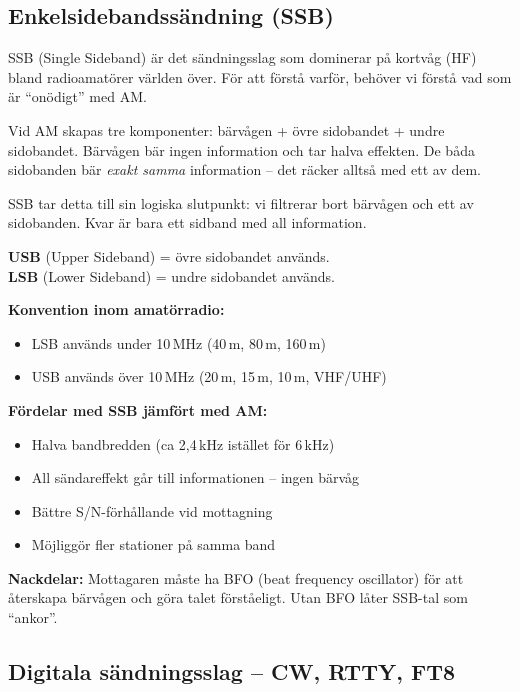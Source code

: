 \documentclass[a4paper,11pt,twoside]{book}
\newcommand{\emoji}[1]{{\emojifont #1}}
\begin{document}
\subsection{Enkelsidebandssändning (SSB)}

SSB (Single Sideband) är det sändningsslag som dominerar på
kortvåg (HF) bland radioamatörer världen över. För att förstå
varför, behöver vi förstå vad som är ``onödigt'' med AM.

Vid AM skapas tre komponenter: bärvågen + övre sidobandet + undre
sidobandet. Bärvågen bär ingen information och tar halva effekten.
De båda sidobanden bär \emph{exakt samma} information -- det räcker
alltså med ett av dem.

SSB tar detta till sin logiska slutpunkt: vi filtrerar bort bärvågen
och ett av sidobanden. Kvar är bara ett sidband med all information.

\begin{bluebox}[title={\emoji{🔑} SSB -- Enkelsidebandssändning}]
\textbf{USB} (Upper Sideband) = övre sidobandet används.\\
\textbf{LSB} (Lower Sideband) = undre sidobandet används.

\medskip
\textbf{Konvention inom amatörradio:}
\begin{itemize}
  \item LSB används under 10\,MHz (40\,m, 80\,m, 160\,m)
  \item USB används över 10\,MHz (20\,m, 15\,m, 10\,m, VHF/UHF)
\end{itemize}

\medskip
\textbf{Fördelar med SSB jämfört med AM:}
\begin{itemize}
  \item Halva bandbredden (ca 2,4\,kHz istället för 6\,kHz)
  \item All sändareffekt går till informationen -- ingen bärvåg
  \item Bättre S/N-förhållande vid mottagning
  \item Möjliggör fler stationer på samma band
\end{itemize}

\textbf{Nackdelar:} Mottagaren måste ha BFO (beat frequency
oscillator) för att återskapa bärvågen och göra talet förståeligt.
Utan BFO låter SSB-tal som ``ankor''.
\end{bluebox}

\subsection{Digitala sändningsslag -- CW, RTTY, FT8}
\end{document}
